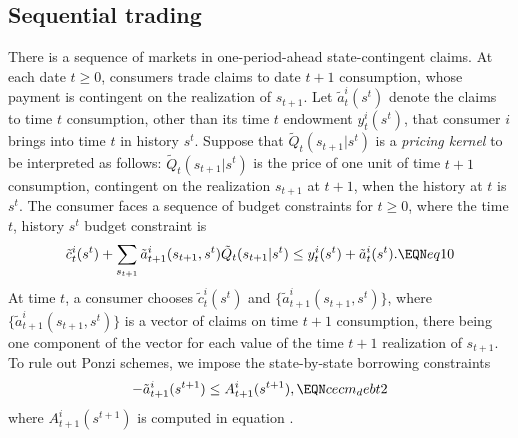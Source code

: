 \subsection{Sequential trading}
There is a sequence of markets in one-period-ahead
state-contingent
 claims.    At each date $t \geq 0$,
consumers trade claims to date $t+1$ consumption, whose payment
is  contingent
on the realization of $s_{t+1}$.   Let $\tilde a_t^i(s^t)$ denote the
claims to time $t$ consumption, other than its time $t$  endowment $y_t^i(s^t)$,
that consumer $i$ brings into time $t$ in history $s^t$. Suppose that
$ \tilde Q_t(s_{t+1} | s^t)$
is a {\it pricing kernel}  to be interpreted as follows:
$\tilde Q_t(s_{t+1} | s^t)$ is the price of one unit of time $t+1$ consumption,
contingent on the realization $s_{t+1}$ at $t+1$, when the
history at $t$ is $s^t$.
The consumer faces a sequence of budget constraints
for $t \geq 0$, where the time $t$, history $s^t$ budget constraint is
$$ \tilde c_t^i(s^t) + \sum_{s_{t+1}} \tilde a^i_{t+1}(s_{t+1},s^t) \tilde Q_t(s_{t+1} | s^t)
     \leq  y_t^i(s^t) + \tilde a_t^i(s^t) . \EQN eq10   $$
At time $t$, a consumer chooses $\tilde c^i_t(s^t)$
and $\{\tilde a^i_{t+1}(s_{t+1},s^t)\}$, where
$\{\tilde a^i_{t+1}(s_{t+1},s^t)\}$  is a vector of claims on time $t+1$ consumption,
there being one component of the vector for each  value of the time $t+1$ realization of
$s_{t+1}$.    To rule out Ponzi schemes,
we impose the state-by-state borrowing
constraints
$$ -  \tilde a^i_{t+1}(s^{t+1}) \leq  A^i_{t+1}(s^{t+1}),        \EQN cecm_debt2$$
where $A^i_{t+1}(s^{t+1})$ is computed in equation .


